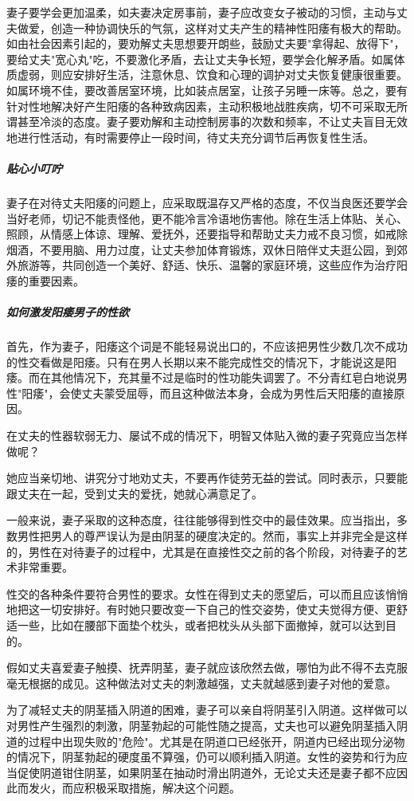 \begin{enumerate}
妻子要学会更加温柔，如夫妻决定房事前，妻子应改变女子被动的习惯，主动与丈夫做爱，创造一种协调快乐的气氛，这样对丈夫产生的精神性阳痿有极大的帮助。如由社会因素引起的，要劝解丈夫思想要开朗些，鼓励丈夫要"拿得起、放得下"，要给丈夫"宽心丸"吃，不要激化矛盾，去让丈夫争长短，要学会化解矛盾。如属体质虚弱，则应安排好生活，注意休息、饮食和心理的调护对丈夫恢复健康很重要。如属环境不佳，要改善居室环境，比如装点居室，让孩子另睡一床等。总之，要有针对性地解决好产生阳痿的各种致病因素，主动积极地战胜疾病，切不可采取无所谓甚至冷淡的态度。妻子要劝解和主动控制房事的次数和频率，不让丈夫盲目无效地进行性活动，有时需要停止一段时间，待丈夫充分调节后再恢复性生活。

\subparagraph{贴心小叮咛}

妻子在对待丈夫阳痿的问题上，应采取既温存又严格的态度，不仅当良医还要学会当好老师，切记不能责怪他，更不能冷言冷语地伤害他。除在生活上体贴、关心、照顾，从情感上体谅、理解、爱抚外，还要指导和帮助丈夫力戒不良习惯，如戒除烟酒，不要用脑、用力过度，让丈夫参加体育锻炼，双休日陪伴丈夫逛公园，到郊外旅游等，共同创造一个美好、舒适、快乐、温馨的家庭环境，这些应作为治疗阳痿的重要因素。

\subparagraph{如何激发阳痿男子的性欲}

首先，作为妻子，阳痿这个词是不能轻易说出口的，不应该把男性少数几次不成功的性交看做是阳痿。只有在男人长期以来不能完成性交的情况下，才能说这是阳痿。而在其他情况下，充其量不过是临时的性功能失调罢了。不分青红皂白地说男性"阳痿"，会使丈夫蒙受屈辱，而且这种做法本身，会成为男性后天阳痿的直接原因。

在丈夫的性器软弱无力、屡试不成的情况下，明智又体贴入微的妻子究竟应当怎样做呢？

她应当亲切地、讲究分寸地劝丈夫，不要再作徒劳无益的尝试。同时表示，只要能跟丈夫在一起，受到丈夫的爱抚，她就心满意足了。

一般来说，妻子采取的这种态度，往往能够得到性交中的最佳效果。应当指出，多数男性把男人的尊严误认为是由阴茎的硬度决定的。然而，事实上并非完全是这样的，男性在对待妻子的过程中，尤其是在直接性交之前的各个阶段，对待妻子的艺术非常重要。

性交的各种条件要符合男性的要求。女性在得到丈夫的愿望后，可以而且应该悄悄地把这一切安排好。有时她只要改变一下自己的性交姿势，使丈夫觉得方便、更舒适一些，比如在腰部下面垫个枕头，或者把枕头从头部下面撤掉，就可以达到目的。

假如丈夫喜爱妻子触摸、抚弄阴茎，妻子就应该欣然去做，哪怕为此不得不去克服毫无根据的成见。这种做法对丈夫的刺激越强，丈夫就越感到妻子对他的爱意。

为了减轻丈夫的阴茎插入阴道的困难，妻子可以亲自将阴茎引入阴道。这样做可以对男性产生强烈的刺激，阴茎勃起的可能性随之提高，丈夫也可以避免阴茎插入阴道的过程中出现失败的"危险"。尤其是在阴道口已经张开，阴道内已经出现分泌物的情况下，阴茎勃起的硬度虽不算强，仍可以顺利插入阴道。女性的姿势和行为应当促使阴道钳住阴茎，如果阴茎在抽动时滑出阴道外，无论丈夫还是妻子都不应因此而发火，而应积极采取措施，解决这个问题。


\end{enumerate}
